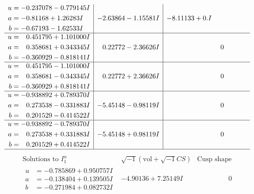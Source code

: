 \documentclass[1p]{elsarticle_modified}
\theoremstyle{definition}
\newcommand{\I}{\sqrt{-1}}
\begin{document}
$$\begin{array}{c|c|c}
\begin{aligned}
u &= -0.237078 - 0.779145 I \\
a &= -0.81168 + 1.26283 I \\
b &= -0.67193 - 1.62533 I\end{aligned}
 & -2.63864 - 1.15581 I & -8.11133 + 0. I\phantom{ +0.000000I} \\ \hline\begin{aligned}
u &= \phantom{-}0.451795 + 1.101000 I \\
a &= \phantom{-}0.358681 + 0.343345 I \\
b &= -0.360929 - 0.818141 I\end{aligned}
 & \phantom{-}0.22772 - 2.36626 I & \phantom{-0.000000 } 0 \\ \hline\begin{aligned}
u &= \phantom{-}0.451795 - 1.101000 I \\
a &= \phantom{-}0.358681 - 0.343345 I \\
b &= -0.360929 + 0.818141 I\end{aligned}
 & \phantom{-}0.22772 + 2.36626 I & \phantom{-0.000000 } 0 \\ \hline\begin{aligned}
u &= -0.938892 + 0.789370 I \\
a &= \phantom{-}0.273538 - 0.331883 I \\
b &= \phantom{-}0.201529 - 0.414522 I\end{aligned}
 & -5.45148 - 0.98119 I & \phantom{-0.000000 } 0 \\ \hline\begin{aligned}
u &= -0.938892 - 0.789370 I \\
a &= \phantom{-}0.273538 + 0.331883 I \\
b &= \phantom{-}0.201529 + 0.414522 I\end{aligned}
 & -5.45148 + 0.98119 I & \phantom{-0.000000 } 0\\
 \hline 
 \end{array}$$\newpage$$\begin{array}{c|c|c}  
\text{Solutions to }I^u_{1}& \I (\text{vol} + \sqrt{-1}CS) & \text{Cusp shape}\\
 \hline 
\begin{aligned}
u &= -0.785869 + 0.950757 I \\
a &= -0.138404 + 0.139505 I \\
b &= -0.271984 + 0.082732 I\end{aligned}
 & -4.90136 + 7.25149 I & \phantom{-0.000000 } 0 \\ \hline\begin{aligned}

\end{aligned}
\end{array}$$
\end{document}

